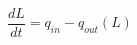 \documentclass[preview]{standalone}
\begin{document}
\begin{align*}
\dfrac{dL}{dt} = q_{in} - q_{out}(L)
\end{align*}
\end{document}
